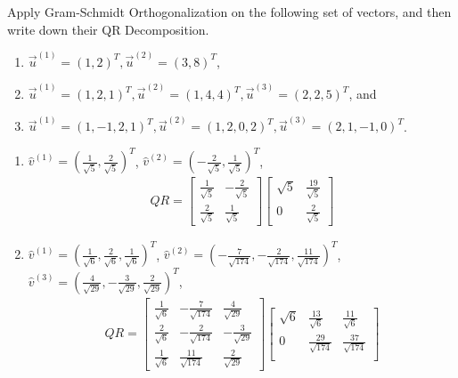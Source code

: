 \begin{Exercise}
Apply Gram-Schmidt Orthogonalization on the following set of vectors, and then write down their QR Decomposition.
\begin{enumerate}[label=(\alph*)]
\item $\vec{u}^{(1)} = (1,2)^T, \vec{u}^{(2)} = (3,8)^T$,
\item $\vec{u}^{(1)} = (1,2,1)^T, \vec{u}^{(2)} = (1,4,4)^T, \vec{u}^{(3)} = (2,2,5)^T$, and
\item $\vec{u}^{(1)} = (1,-1,2,1)^T, \vec{u}^{(2)} = (1,2,0,2)^T, \vec{u}^{(3)} = (2,1,-1,0)^T$.
\end{enumerate}  
\end{Exercise}
\begin{Answer}
\begin{enumerate}[label=(\alph*)]
\item $\hat{v}^{(1)} = (\frac{1}{\sqrt{5}}, \frac{2}{\sqrt{5}})^T$, $\hat{v}^{(2)} = (-\frac{2}{\sqrt{5}}, \frac{1}{\sqrt{5}})^T$,
\begin{align*}
QR =
\begin{bmatrix}
\frac{1}{\sqrt{5}} & -\frac{2}{\sqrt{5}} \\
\frac{2}{\sqrt{5}} & \frac{1}{\sqrt{5}}
\end{bmatrix}
\begin{bmatrix}
\sqrt{5}&\frac{19}{\sqrt{5}}\\ 
0&\frac{2}{\sqrt{5}}
\end{bmatrix}
\end{align*}
\item $\hat{v}^{(1)} = (\frac{1}{\sqrt{6}}, \frac{2}{\sqrt{6}}, \frac{1}{\sqrt{6}})^T$, $\hat{v}^{(2)} = (-\frac{7}{\sqrt{174}}, -\frac{2}{\sqrt{174}}, \frac{11}{\sqrt{174}})^T$, \\$\hat{v}^{(3)} = (\frac{4}{\sqrt{29}}, -\frac{3}{\sqrt{29}}, \frac{2}{\sqrt{29}})^T$,
\begin{align*}
QR =
\begin{bmatrix}
\frac{1}{\sqrt{6}} & -\frac{7}{\sqrt{174}} & \frac{4}{\sqrt{29}} \\
\frac{2}{\sqrt{6}} & -\frac{2}{\sqrt{174}} & -\frac{3}{\sqrt{29}} \\
\frac{1}{\sqrt{6}} & \frac{11}{\sqrt{174}} & \frac{2}{\sqrt{29}}
\end{bmatrix}
\begin{bmatrix}\sqrt{6}&\frac{13}{\sqrt{6}}&\frac{11}{\sqrt{6}}\\ 
0&\frac{29}{\sqrt{174}}&\frac{37}{\sqrt{174}}\\ 

\end{bmatrix}
\end{align*}
\end{enumerate}
\end{Answer}
